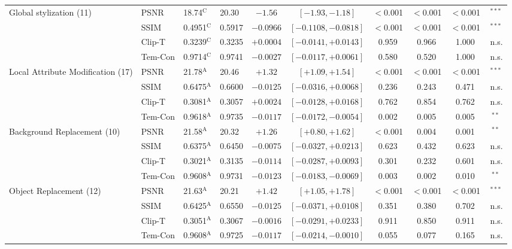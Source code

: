 \begin{longtable}{@{\extracolsep{\fill}} l l l l c c c c c c @{}}
\hline
Global stylization (11) & PSNR & 18.74$^{\mathrm{C}}$ & 20.30 & $-1.56$ & $[-1.93, -1.18]$ & $<$0.001 & $<$0.001 & $<$0.001 & $^{***}$ \\
 & SSIM & 0.4951$^{\mathrm{C}}$ & 0.5917 & $-0.0966$ & $[-0.1108, -0.0818]$ & $<$0.001 & $<$0.001 & $<$0.001 & $^{***}$ \\
 & Clip-T & 0.3239$^{\mathrm{C}}$ & 0.3235 & $+0.0004$ & $[-0.0141, +0.0143]$ & 0.959 & 0.966 & 1.000 & \,{\scriptsize n.s.} \\
 & Tem-Con & 0.9714$^{\mathrm{C}}$ & 0.9741 & $-0.0027$ & $[-0.0117, +0.0061]$ & 0.580 & 0.520 & 1.000 & \,{\scriptsize n.s.} \\
Local Attribute Modification (17) & PSNR & 21.78$^{\mathrm{A}}$ & 20.46 & $+1.32$ & $[+1.09, +1.54]$ & $<$0.001 & $<$0.001 & $<$0.001 & $^{***}$ \\
 & SSIM & 0.6475$^{\mathrm{A}}$ & 0.6600 & $-0.0125$ & $[-0.0316, +0.0068]$ & 0.236 & 0.243 & 0.471 & \,{\scriptsize n.s.} \\
 & Clip-T & 0.3081$^{\mathrm{A}}$ & 0.3057 & $+0.0024$ & $[-0.0128, +0.0168]$ & 0.762 & 0.854 & 0.762 & \,{\scriptsize n.s.} \\
 & Tem-Con & 0.9618$^{\mathrm{A}}$ & 0.9735 & $-0.0117$ & $[-0.0172, -0.0054]$ & 0.002 & 0.005 & 0.005 & $^{**}$ \\
Background Replacement (10) & PSNR & 21.58$^{\mathrm{A}}$ & 20.32 & $+1.26$ & $[+0.80, +1.62]$ & $<$0.001 & 0.004 & 0.001 & $^{**}$ \\
 & SSIM & 0.6375$^{\mathrm{A}}$ & 0.6450 & $-0.0075$ & $[-0.0327, +0.0213]$ & 0.623 & 0.432 & 0.623 & \,{\scriptsize n.s.} \\
 & Clip-T & 0.3021$^{\mathrm{A}}$ & 0.3135 & $-0.0114$ & $[-0.0287, +0.0093]$ & 0.301 & 0.232 & 0.601 & \,{\scriptsize n.s.} \\
 & Tem-Con & 0.9608$^{\mathrm{A}}$ & 0.9731 & $-0.0123$ & $[-0.0183, -0.0069]$ & 0.003 & 0.002 & 0.010 & $^{**}$ \\
Object Replacement (12) & PSNR & 21.63$^{\mathrm{A}}$ & 20.21 & $+1.42$ & $[+1.05, +1.78]$ & $<$0.001 & $<$0.001 & $<$0.001 & $^{***}$ \\
 & SSIM & 0.6425$^{\mathrm{A}}$ & 0.6550 & $-0.0125$ & $[-0.0371, +0.0108]$ & 0.351 & 0.380 & 0.702 & \,{\scriptsize n.s.} \\
 & Clip-T & 0.3051$^{\mathrm{A}}$ & 0.3067 & $-0.0016$ & $[-0.0291, +0.0233]$ & 0.911 & 0.850 & 0.911 & \,{\scriptsize n.s.} \\
 & Tem-Con & 0.9608$^{\mathrm{A}}$ & 0.9725 & $-0.0117$ & $[-0.0214, -0.0010]$ & 0.055 & 0.077 & 0.165 & \,{\scriptsize n.s.} \\

\end{longtable}
